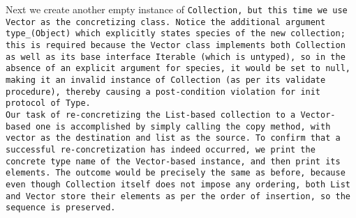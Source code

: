 Next we create another empty instance of \tt{Collection},
but this time we use \tt{Vector} as the concretizing class.
Notice the additional argument \tt{type_(Object)} which explicitly states
\tt{species} of the new collection; this is required because the \tt{Vector}
class implements both \tt{Collection} as well as its base interface
\tt{Iterable} (which is untyped), so in the absence of an explicit argument
for \tt{species}, it would be set to null, making it an invalid instance
of \tt{Collection} (as per its \tt{validate} procedure), thereby causing
a post-condition violation for \tt{init} protocol of \tt{Type}.\\

Our task of re-concretizing the \tt{List}-based collection to a
\tt{Vector}-based one is accomplished by simply calling the \tt{copy} method,
with \tt{vector} as the destination and \tt{list} as the source.
To confirm that a successful re-concretization has indeed occurred, we print the
concrete type name of the \tt{Vector}-based instance, and then print its elements.
The outcome would be precisely the same as before,
because even though \tt{Collection} itself does not impose any ordering, both
\tt{List} and \tt{Vector} store their elements as per the order of insertion,
so the sequence is preserved.

